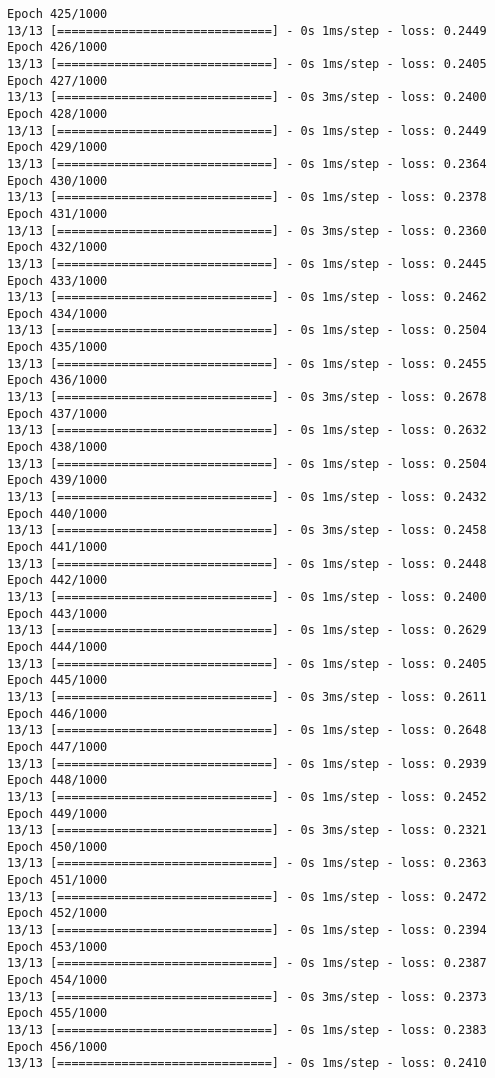 \documentclass[11pt]{article}
\begin{document}
\begin{Verbatim}[commandchars=\\\{\}]
Epoch 425/1000
13/13 [==============================] - 0s 1ms/step - loss: 0.2449
Epoch 426/1000
13/13 [==============================] - 0s 1ms/step - loss: 0.2405
Epoch 427/1000
13/13 [==============================] - 0s 3ms/step - loss: 0.2400
Epoch 428/1000
13/13 [==============================] - 0s 1ms/step - loss: 0.2449
Epoch 429/1000
13/13 [==============================] - 0s 1ms/step - loss: 0.2364
Epoch 430/1000
13/13 [==============================] - 0s 1ms/step - loss: 0.2378
Epoch 431/1000
13/13 [==============================] - 0s 3ms/step - loss: 0.2360
Epoch 432/1000
13/13 [==============================] - 0s 1ms/step - loss: 0.2445
Epoch 433/1000
13/13 [==============================] - 0s 1ms/step - loss: 0.2462
Epoch 434/1000
13/13 [==============================] - 0s 1ms/step - loss: 0.2504
Epoch 435/1000
13/13 [==============================] - 0s 1ms/step - loss: 0.2455
Epoch 436/1000
13/13 [==============================] - 0s 3ms/step - loss: 0.2678
Epoch 437/1000
13/13 [==============================] - 0s 1ms/step - loss: 0.2632
Epoch 438/1000
13/13 [==============================] - 0s 1ms/step - loss: 0.2504
Epoch 439/1000
13/13 [==============================] - 0s 1ms/step - loss: 0.2432
Epoch 440/1000
13/13 [==============================] - 0s 3ms/step - loss: 0.2458
Epoch 441/1000
13/13 [==============================] - 0s 1ms/step - loss: 0.2448
Epoch 442/1000
13/13 [==============================] - 0s 1ms/step - loss: 0.2400
Epoch 443/1000
13/13 [==============================] - 0s 1ms/step - loss: 0.2629
Epoch 444/1000
13/13 [==============================] - 0s 1ms/step - loss: 0.2405
Epoch 445/1000
13/13 [==============================] - 0s 3ms/step - loss: 0.2611
Epoch 446/1000
13/13 [==============================] - 0s 1ms/step - loss: 0.2648
Epoch 447/1000
13/13 [==============================] - 0s 1ms/step - loss: 0.2939
Epoch 448/1000
13/13 [==============================] - 0s 1ms/step - loss: 0.2452
Epoch 449/1000
13/13 [==============================] - 0s 3ms/step - loss: 0.2321
Epoch 450/1000
13/13 [==============================] - 0s 1ms/step - loss: 0.2363
Epoch 451/1000
13/13 [==============================] - 0s 1ms/step - loss: 0.2472
Epoch 452/1000
13/13 [==============================] - 0s 1ms/step - loss: 0.2394
Epoch 453/1000
13/13 [==============================] - 0s 1ms/step - loss: 0.2387
Epoch 454/1000
13/13 [==============================] - 0s 3ms/step - loss: 0.2373
Epoch 455/1000
13/13 [==============================] - 0s 1ms/step - loss: 0.2383
Epoch 456/1000
13/13 [==============================] - 0s 1ms/step - loss: 0.2410

\end{Verbatim}
\end{document}
